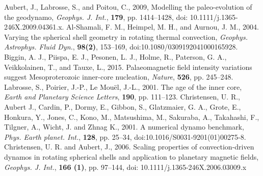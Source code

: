 \begin{thebibliography}{}

%
Aubert, J., Labrosse, S., and Poitou, C., 2009, Modelling the paleo-evolution of the geodynamo, {\it Geophys. J. Int.}, {\bf 179}, pp. 1414--1428, doi: 10.1111/j.1365-246X.2009.04361.x.
%
Al-Shamali, F. M., Heimpel, M. H., and Aurnou, J. M., 2004. Varying the spherical shell geometry in rotating thermal convection, {\it Geophys. Astrophys. Fluid Dyn.}, {\bf 98(2)}, 153--169, doi:10.1080/0309192041000165928.
%
Biggin, A. J., Piispa, E. J., Pesonen, L. J., Holme, R., Paterson, G. A., Veikkolainen, T., and Tauxe, L., 2015. Palaeomagnetic field intensity variations suggest Mesoproterozoic inner-core nucleation, {\it Nature}, {\bf 526}, pp. 245–248.
%
Labrosse, S., Poirier, J.-P., Le Mou{\"e}l, J.-L., 2001. The age of the inner core, {\it Earth and Planetary Science Letters}, {\bf 190}, pp. 111--123.
%
Christensen, U. R., Aubert J., Cardin, P., Dormy, E., Gibbon, S., Glatzmaier, G. A., Grote, E., Honkura, Y., Jones, C., Kono, M., Matsushima, M., Sakuraba, A., Takahashi, F., Tilgner, A., Wicht, J. and Zhnag K., 2001. A numerical dynamo benchmark, {\it Phys. Earth planet. Int.}, {\bf 128}, pp. 25--34, doi:10.1016/S0031-9201(01)00275-8.
%
Christensen, U. R. and Aubert, J., 2006. Scaling properties of convection-driven dynamos in rotating spherical shells and application to planetary magnetic fields, {\it Geophys. J. Int.}, {\bf 166 (1)}, pp. 97--144, doi: 10.1111/j.1365-246X.2006.03009.x
%
\end{thebibliography}
